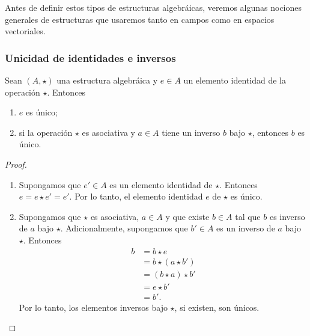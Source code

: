 \documentclass[apuntes]{subfiles}
\begin{document}
Antes de definir estos tipos de estructuras algebráicas, veremos algunas nociones generales de estructuras que usaremos tanto en campos como en espacios vectoriales.

\subsubsection{Unicidad de identidades e inversos} \label{Sssec: Unicidad de identidades e inversos}
    
    Sean $(A,\star)$ una estructura algebráica y $e\in A$ un elemento identidad de la operación $\star$. Entonces

    \begin{enumerate}[label=(\alph*)]
        \item $e$ es único;

        \item si la operación $\star$ es asociativa y $a\in A$ tiene un inverso $b$ bajo $\star$, entonces $b$ es único.
    \end{enumerate}

\begin{proof}\leavevmode
    
    \begin{enumerate}[label=(\alph*)]

        \item Supongamos que $e'\in A$ es un elemento identidad de $\star$. Entonces $e=e\star e'=e'$. Por lo tanto, el elemento identidad $e$ de $\star$ es único.

        \item Supongamos que $\star$ es asociativa, $a\in A$ y que existe $b\in A$ tal que $b$ es inverso de $a$ bajo $\star$. Adicionalmente, supongamos que $b'\in A$ es un inverso de $a$ bajo $\star$. Entonces
            \begin{align*}
                b &= b\star e \tag{$e$ es neutro} \\
                  &= b\star (a\star b') \tag{$b'$ es inverso de $a$} \\
                  &= (b\star a)\star b' \tag{$\star$ es asociativa} \\
                  &= e\star b' \tag{$b$ es inverso de $a$} \\
                  &= b'.
            \end{align*}
            Por lo tanto, los elementos inversos bajo $\star$, si existen, son únicos.
    \end{enumerate}
\end{proof}
\end{document}
